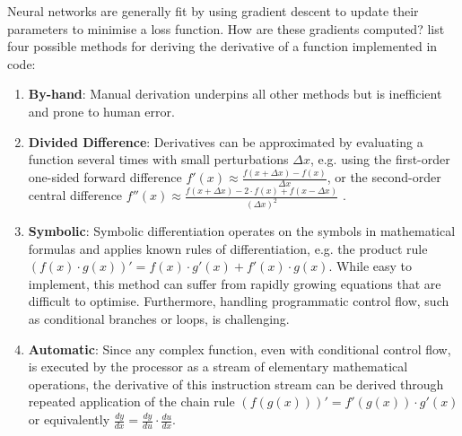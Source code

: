 Neural networks are generally fit by using gradient descent to update their parameters to minimise a loss function. How are these gradients computed? \textcite{adifor-1992} list four possible methods for deriving the derivative of a function implemented in code:
\begin{enumerate}
    \item \textbf{By-hand}: Manual derivation underpins all other methods but is inefficient and prone to human error.
    \item \textbf{Divided Difference}: Derivatives can be approximated by evaluating a function several times with small perturbations $\Delta x$, e.g. using the first-order one-sided forward difference $f'(x) \approx \frac{f(x + \Delta x) - f(x)}{\Delta x}$, or the second-order central difference $f''(x) \approx \frac{f(x + \Delta x) - 2 \cdot f(x) + f(x - \Delta x)}{(\Delta x)^2}$ \cite{finite-difference-2022}.
    \item \textbf{Symbolic}: Symbolic differentiation operates on the symbols in mathematical formulas and applies known rules of differentiation, e.g. the product rule $(f(x) \cdot g(x))' = f(x) \cdot g'(x) + f'(x) \cdot g(x)$. While easy to implement, this method can suffer from rapidly growing equations that are difficult to optimise. Furthermore, handling programmatic control flow, such as conditional branches or loops, is challenging.
    \item \textbf{Automatic}: Since any complex function, even with conditional control flow, is executed by the processor as a stream of elementary mathematical operations, the derivative of this instruction stream can be derived through repeated application of the chain rule $(f(g(x)))' = f'(g(x)) \cdot g'(x)$ or equivalently $\frac{dy}{dx} = \frac{dy}{du} \cdot \frac{du}{dx}$.
\end{enumerate}
